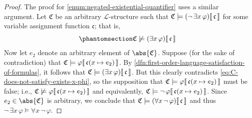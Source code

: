 \begin{proof}
    \vspace{0.3cm}
    \noindent
    The proof for \ref{enum:negated-existential-quantifier} uses a similar argument. Let \( \mathfrak{C} \) be an arbitrary \( \mathcal{L} \)-structure such that
    \( \folwffsatisfaction{\mathfrak{C}}{\mleft( \lnot \, \exists x \, \varphi \mright)}{\mathfrak{c}} \) for some variable assignment function \( \mathfrak{c} \);
    that is,
    \begin{equation}
        \phantomsection \label{eq:C-does-not-satisfy-exists-x-phi}
        \folwffnonsatisfaction{\mathfrak{C}}{\mleft( \exists x \, \varphi \mright)}{\mathfrak{c}}
    \end{equation}
    Now let \( e_{2} \) denote an arbitrary element of \( \abs{\mathfrak{C}} \).
    Suppose (for the sake of contradiction) that \( \folwffsatisfaction{\mathfrak{C}}{\varphi}{ \folmodifiedvariableassignmentfunction{\mathfrak{c}}{x}{e_{2}} } \).
    By \cref{dfn:first-order-language-satisfaction-of-formulas}, it follows that
    \( \folwffsatisfaction{\mathfrak{C}}{\mleft( \exists x \, \varphi \mright)}{\mathfrak{c}} \).
    But this clearly contradicts \eqref{eq:C-does-not-satisfy-exists-x-phi}, so the supposition that
    \( \folwffsatisfaction{\mathfrak{C}}{\varphi}{ \folmodifiedvariableassignmentfunction{\mathfrak{c}}{x}{e_{2}} } \) must be false; i.e.,
    \( \folwffnonsatisfaction{\mathfrak{C}}{\varphi}{ \folmodifiedvariableassignmentfunction{\mathfrak{c}}{x}{e_{2}} } \) and equivalently,
    \( \folwffsatisfaction{\mathfrak{C}}{\lnot \, \varphi}{ \folmodifiedvariableassignmentfunction{\mathfrak{c}}{x}{e_{2}} } \).
    Since \( e_{2} \in \abs{\mathfrak{C}} \) is arbitrary, we conclude that
    \( \folwffsatisfaction{\mathfrak{C}}{\mleft( \forall x \, \lnot \, \varphi \mright)}{\mathfrak{c}} \) and thus \( \lnot \, \exists x \, \varphi \models \forall x \, \lnot \, \varphi \).


\end{proof}
